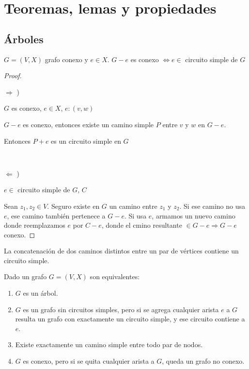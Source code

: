 \section{Teoremas, lemas y propiedades}

\subsection{Árboles}

\begin{lema}
    $G = (V, X)$ grafo conexo y $e \in X$. $G - e$ es conexo $\Longleftrightarrow e \in$ circuito simple de $G$    
\end{lema}

\begin{proof}
    ~

    $\Longrightarrow$ )

    $G$ es conexo, $e \in X$, $e:(v, w)$

    $G - e$ es conexo, entonces existe un camino simple $P$ entre $v$ y $w$ en $G - e$.

    Entonces $P + e$ es un circuito simple en $G$

    ~

    $\Longleftarrow$ )

    $e \in$ circuito simple de $G$, $C$

    Sean $z_1, z_2 \in V$. Seguro existe en $G$ un camino entre $z_1$ y $z_2$. Si ese camino no usa $e$, ese camino también pertenece a $G - e$. Si usa $e$, armamos un nuevo camino donde reemplazamos $e$ por $C - e$, donde el cmino resultante $\in G - e \Longrightarrow G - e$ conexo.
\end{proof}

\begin{lema}
    La concatenación de dos caminos distintos entre un par de vértices contiene un circuito simple.
\end{lema}

\begin{teo}
    Dado un grafo $G = (V, X)$ son equivalentes:

    \begin{enumerate}
        \item $G$ es un árbol.
        \item $G$ es un grafo sin circuitos simples, pero si se agrega cualquier arista $e$ a $G$resulta un grafo con exactamente un circuito simple, y ese circuito contiene a $e$.
        \item Existe exactamente un camino simple entre todo par de nodos.
        \item $G$ es conexo, pero si se quita cualquier arista a $G$, queda un grafo no conexo.
    \end{enumerate}
\end{teo}

